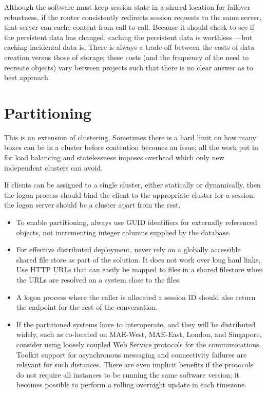 \documentclass[draft]{report}
\begin{document}
Although the software must keep session state in a shared location for
failover robustness, if the router consistently redirects session
requests to the same server, that server can cache content from call to
call. Because it should check to see if the persistent data has changed,
caching the persistent data is worthless ---but caching incidental data
is. There is always a trade-off between the costs of data creation
versus those of storage; these costs (and the frequency of the need to
recreate objects) vary between projects such that there is no clear
answer as to best approach.

\section{Partitioning}

This is an extension of clustering. Sometimes there is a hard limit on
how many boxes can be in a cluster before contention becomes an issue;
all the work put in for load balancing and statelessness imposes
overhead which only new independent clusters can avoid.

If clients can be assigned to a single cluster, either statically or
dynamically, then the logon process should bind the client to the
appropriate cluster for a session: the logon server should be a cluster
apart from the rest.

\begin{itemize}

\item To enable partitioning, always use GUID identifiers for externally
referenced objects, not incrementing integer columns supplied by the
database.

\item For effective distributed deployment, never rely on a globally
accessible shared file store as part of the solution. It does not work
over long haul links, Use HTTP URLs that can easily be mapped to files
in a shared filestore when the URLs are resolved on a system close to
the files.

\item A logon process where the caller is allocated a session ID should
also return the endpoint for the rest of the conversation.

\item If the partitioned systems have to interoperate, and they will be
distributed widely, such as co-located on MAE-West, MAE-East, London,
and Singapore, consider using loosely coupled Web Service protocols for
the communications. Toolkit support for asynchronous messaging and
connectivity failures are relevant for such distances. There are even
implicit benefits if the protocols do not require all instances to be
running the same software version; it becomes possible to perform a
rolling overnight update in each timezone.

\end{itemize}
\end{document}
